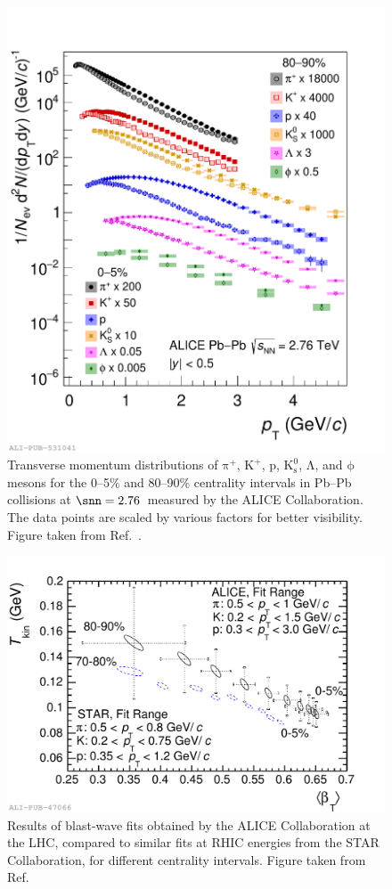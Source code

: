 \begin{figure}[t]
  \centering
  \includegraphics[width=0.7\linewidth]{Figures/Chapter 1/spectra_run1.pdf}
  \caption{Transverse momentum distributions of $\mathrm{\pi^+}$, $\mathrm{K^+}$, p, $\mathrm{K^0_s}$, $\mathrm{\Lambda}$, and $\mathrm{\phi}$ mesons for the 0--5\% and 80--90\% centrality intervals in Pb--Pb collisions at $\snn=2.76$~\tev measured by the ALICE Collaboration. The data points are scaled by various factors for better visibility. Figure taken from Ref.~\cite{ALICE:2022wpn}.}
  \label{fig:RadialFlow}
\end{figure}

\begin{figure}[htb]
  \centering
  \includegraphics[width=0.7\linewidth]{Figures/Chapter 1/2014-Feb-27-cBlastWaveVsSTAR.pdf}
  \caption{Results of blast-wave fits obtained by the ALICE Collaboration at the LHC, compared to similar fits at RHIC energies from the STAR Collaboration, for different centrality intervals. Figure taken from Ref.~\cite{ALICE:2013mez}}
  \label{fig:blast_wave_fit}
\end{figure}

